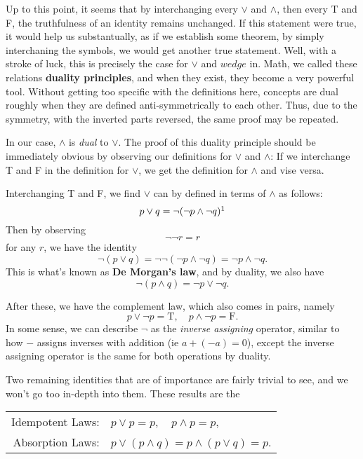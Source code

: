 Up to this point, it seems that by interchanging every $\vee$ and $\wedge$, then every T and F, the truthfulness of an identity remains unchanged.
If this statement were true, it would help us substantually, as if we establish some theorem, by simply interchaning the symbols, we would get another true statement.
Well, with a stroke of luck, this is precisely the case for $\vee$ and $wedge$ in. Math, we called these relations \textbf{duality principles}, and when they exist, they become a very powerful tool.
Without getting too specific with the definitions here, concepts are dual roughly when they are defined anti-symmetrically to each other.
Thus, due to the symmetry, with the inverted parts reversed, the same proof may be repeated.

In our case, $\wedge$ is \textit{dual} to $\vee$.
The proof of this duality principle should be immediately obvious by observing our definitions for $\vee$ and $\wedge$:
If we interchange T and F in the definition for $\vee$, we get the definition for $\wedge$ and vise versa.

Interchanging T and F, we find $\vee$ can by defined in terms of $\wedge$ as follows:
$$p \vee q = \neg (\neg p \wedge \neg q)\footnotemark$$
Then by observing
$$\neg \neg r = r$$
for any $r$, we have the identity
$$\neg (p\vee q) = \neg \neg (\neg p \wedge \neg q)= \neg p \wedge \neg q.$$
This is what's known as \textbf{De Morgan's law}, and by duality, we also have
$$\neg (p\wedge q) =\neg p \vee \neg q.$$


After these, we have the complement law, which also comes in pairs, namely
$$p \vee \neg p = \text{T}, \quad p \wedge \neg p = \text{F}.$$
In some sense, we can describe $\neg$ as the \textit{inverse assigning} operator, similar to how $-$ assigns inverses with addition (ie $a+(-a)=0$), except the inverse assigning operator is the same for both operations by duality.

Two remaining identities that are of importance are fairly trivial to see, and we won't go too in-depth into them. These results are the
\begin{center}
	\begin{tabular}{rl}
	Idempotent Laws: & $p \vee p = p, \quad p \wedge p = p$, \\
	Absorption Laws: & $p \vee (p \wedge q) = p \wedge (p \vee q) = p$.
\end{tabular}
\end{center}

